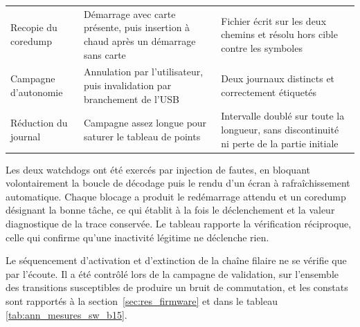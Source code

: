 \begin{longtable}{p{} p{} p{}}
    Recopie du coredump                       & Démarrage avec carte présente, puis insertion à chaud après un démarrage sans carte              & Fichier écrit sur les deux chemins et résolu hors cible contre les symboles                \\
    Campagne d'autonomie                      & Annulation par l'utilisateur, puis invalidation par branchement de l'USB                         & Deux journaux distincts et correctement étiquetés                                          \\
    Réduction du journal                      & Campagne assez longue pour saturer le tableau de points                                          & Intervalle doublé sur toute la longueur, sans discontinuité ni perte de la partie initiale \\
\end{longtable}
\endgroup

Les deux watchdogs ont été exercés par injection de fautes, en bloquant volontairement la boucle de décodage puis le rendu d'un écran à rafraîchissement automatique. Chaque blocage a produit le redémarrage attendu et un \gls{coredump} désignant la bonne tâche, ce qui établit à la fois le déclenchement et la valeur diagnostique de la trace conservée. Le tableau rapporte la vérification réciproque, celle qui confirme qu'une inactivité légitime ne déclenche rien.

Le séquencement d'activation et d'extinction de la chaîne filaire ne se vérifie que par l'écoute. Il a été contrôlé lors de la campagne de validation, sur l'ensemble des transitions susceptibles de produire un bruit de commutation, et les constats sont rapportés à la section~\ref{sec:res_firmware} et dans le tableau \ref{tab:ann_mesures_sw_b15}.